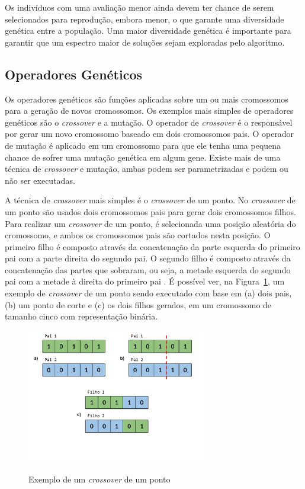 \documentclass[12pt,oneside,a4paper,english,french,spanish,brazil,]{abntex2}
\begin{document}
Os indivíduos com uma avaliação menor ainda devem ter chance de serem selecionados para reprodução, embora menor, o que garante uma diversidade genética entre a população. Uma maior diversidade genética é importante para garantir que um espectro maior de soluções sejam exploradas pelo algoritmo.

\subsection{Operadores Genéticos}

Os operadores genéticos são funções aplicadas sobre um ou mais cromossomos para a geração de novos cromossomos. Os exemplos mais simples de operadores genéticos são o \textit{crossover} e a mutação. O operador de \textit{crossover} é o responsável por gerar um novo cromossomo baseado em dois cromossomos pais. O operador de mutação é aplicado em um cromossomo para que ele tenha uma pequena chance de sofrer uma mutação genética em algum gene. Existe mais de uma técnica de \textit{crossover} e mutação, ambas podem ser parametrizadas e podem ou não ser executadas.

A técnica de \textit{crossover} mais simples é o \textit{crossover} de um ponto. No \textit{crossover} de um ponto são usados dois cromossomos pais para gerar dois cromossomos filhos. Para realizar um \textit{crossover} de um ponto, é selecionada uma posição aleatória do cromossomo, e ambos os cromossomos pais são cortados nesta posição. O primeiro filho é composto através da concatenação da parte esquerda do primeiro pai com a parte direita do segundo pai. O segundo filho é composto através da concatenação das partes que sobraram, ou seja, a metade esquerda do segundo pai com a metade à direita do primeiro pai \cite{linden:2008}. É possível ver, na Figura~\ref{fig:GA_Crossover_de_um_ponto}, um exemplo de \textit{crossover}  de um ponto sendo executado com base em (a) dois pais, (b) um ponto de corte e (c) os dois filhos gerados, em um cromossomo de tamanho cinco com representação binária.

\begin{figure}[ht]
\centering
\caption{Exemplo de um \textit{crossover} de um ponto}
\includegraphics[width=0.7\textwidth]{imagens/GA_Crossover_de_um_ponto.pdf}
\label{fig:GA_Crossover_de_um_ponto}
\end{figure}
\end{document}
